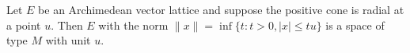 Let $E$ be an Archimedean vector lattice and suppose the positive cone is radial at a point $u$. Then $E$ with the norm $\|x\| = \inf \{t : t > 0, |x| \leq t u\}$ is a space of type $M$ with unit $u$.
